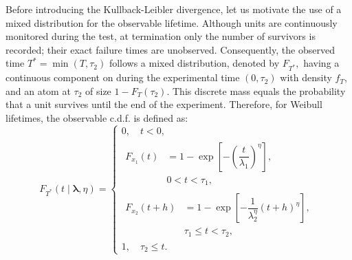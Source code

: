 \documentclass{article}
\begin{document}
Before introducing the Kullback-Leibler divergence, let us motivate the use of a mixed distribution for the observable lifetime. Although units are continuously monitored during the test, at termination only the number of survivors is recorded; their exact failure times are unobserved. Consequently, the observed time $T^{\ast} = \operatorname{min}\left(T, \tau_2\right)$ follows a mixed distribution, denoted by $F_{T^\ast},$ having a continuous component on during the experimental time $(0,\tau_2)$ with density $f_T$, and an atom at $\tau_2$ of size $ 1 - F_T(\tau_2). $ This discrete mass equals the probability that a unit survives until the end of the experiment.
Therefore, for Weibull lifetimes, the observable c.d.f. is defined as:
\begin{equation}
F_{T^{\ast}}(t \mid \boldsymbol{\lambda},\eta)=
\begin{cases}
0, \quad t < 0,
\\
\begin{aligned}
F_{x_1}(t)
&= 1 - \exp\!\left[
-\left(\dfrac{t}{\lambda_1}\right)^{\eta}
\right],
\\[-0.2em]
& 0 < t < \tau_1,
\end{aligned}
\\[0.6em]
\begin{aligned}
F_{x_2}(t+h)
&= 1 - \exp\!\left[
-\dfrac{1}{\lambda_2^{\eta}}
\left(
t + h
\right)^{\eta}
\right],
\\
& \tau_1 \le t < \tau_2,
\end{aligned}
\\
1, \quad \tau_2 \le t.
\end{cases}
\label{eq:funF}
\end{equation}
\end{document}
